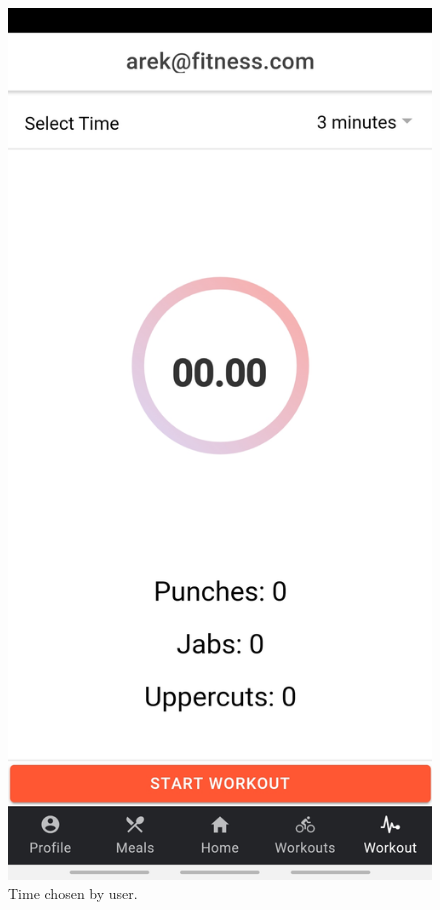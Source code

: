 \documentclass[a4paper,12pt]{report}
\begin{document}
\begin{figure}[ht]
\begin{minipage}[b]{0.5\linewidth}
    \includegraphics[width=.7\linewidth]{images/aplicationImages/3minutesSelected.jpeg} 
    \caption{Time chosen by user.} 
    \vspace{4ex}
  \end{minipage} 
  
\end{figure}
\end{document}
